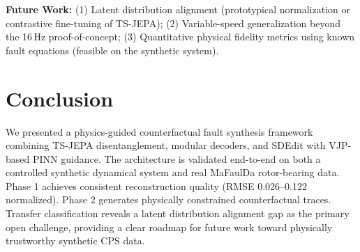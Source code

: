 \documentclass[conference]{IEEEtran}
\begin{document}
\textbf{Future Work:} (1) Latent distribution alignment (prototypical normalization or contrastive fine-tuning of TS-JEPA); (2) Variable-speed generalization beyond the 16\,Hz proof-of-concept; (3) Quantitative physical fidelity metrics using known fault equations (feasible on the synthetic system).


\section{Conclusion}
\label{sec:conclusion}
We presented a physics-guided counterfactual fault synthesis framework combining TS-JEPA disentanglement, modular decoders, and SDEdit with VJP-based PINN guidance. The architecture is validated end-to-end on both a controlled synthetic dynamical system and real MaFaulDa rotor-bearing data. Phase 1 achieves consistent reconstruction quality (RMSE 0.026–0.122 normalized). Phase 2 generates physically constrained counterfactual traces. Transfer classification reveals a latent distribution alignment gap as the primary open challenge, providing a clear roadmap for future work toward physically trustworthy synthetic CPS data.



\end{document}
